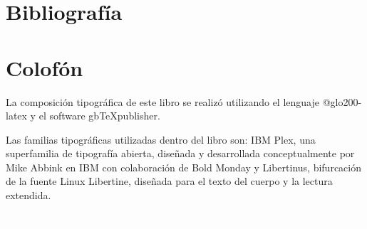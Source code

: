 			\chapter{Bibliografía}
			\printbibliography[heading=none]
			\fi
		\fi
	\fi
\fi





\ifPDF
\printindex[names]
\printindex[concepto]
\printindex[onomastico]
\else
	\ifBNPDF
	\printindex[names]
	\printindex[concepto]
	\printindex[onomastico]
	\fi
\fi

\chapter{Colofón}

La composición tipográfica de este libro se realizó utilizando el lenguaje \gls{@glo200-latex} y el software gbTeXpublisher.

Las familias tipográficas utilizadas dentro del libro son: IBM Plex, una superfamilia de tipografía abierta, diseñada y desarrollada conceptualmente por Mike Abbink en IBM con colaboración de Bold Monday y Libertinus, bifurcación de la fuente Linux Libertine, diseñada para el texto del cuerpo y la lectura extendida.

\ifPDF
\newpage
\thispagestyle{empty}
{\textcolor{white}{.}}
\else
	\ifBNPDF
	\newpage
	\thispagestyle{empty}
	{\textcolor{white}{.}}
	\fi
\fi





